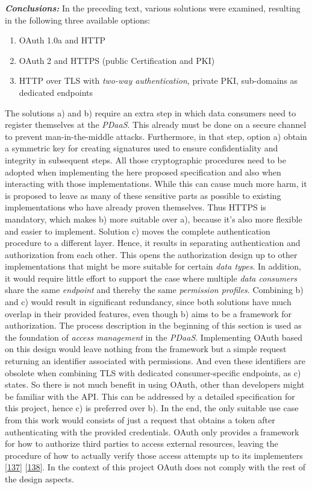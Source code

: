 \documentclass[12pt,english,a4paper,titlepage,cleardoublepage=empty,dottedtoc]{report}
\providecommand{\tightlist}{%
  \setlength{\itemsep}{0pt}\setlength{\parskip}{0pt}}
\begin{document}
\emph{\textbf{Conclusions:}} In the preceding text, various solutions
were examined, resulting in the following three available options:

\begin{enumerate}
\def\labelenumi{\alph{enumi})}
\tightlist
\item
  OAuth 1.0a and HTTP
\item
  OAuth 2 and HTTPS (public Certification and PKI)
\item
  HTTP over TLS with \emph{two-way authentication}, private PKI,
  sub-domains as dedicated endpoints
\end{enumerate}

The solutions a) and b) require an extra step in which data consumers
need to register themselves at the \emph{PDaaS}. This already must be
done on a secure channel to prevent man-in-the-middle attacks.
Furthermore, in that step, option a) obtain a symmetric key for creating
signatures used to ensure confidentiality and integrity in subsequent
steps. All those cryptographic procedures need to be adopted when
implementing the here proposed specification and also when interacting
with those implementations. While this can cause much more harm, it is
proposed to leave as many of these sensitive parts as possible to
existing implementations who have already proven themselves. Thus HTTPS
is mandatory, which makes b) more suitable over a), because it's also
more flexible and easier to implement. Solution c) moves the complete
authentication procedure to a different layer. Hence, it results in
separating authentication and authorization from each other. This opens
the authorization design up to other implementations that might be more
suitable for certain \emph{data types}. In addition, it would require
little effort to support the case where multiple \emph{data consumers}
share the same \emph{endpoint} and thereby the same \emph{permission
profiles}. Combining b) and c) would result in significant redundancy,
since both solutions have much overlap in their provided features, even
though b) aims to be a framework for authorization. The process
description in the beginning of this section is used as the foundation
of \emph{access management} in the \emph{PDaaS}. Implementing OAuth
based on this design would leave nothing from the framework but a simple
request returning an identifier associated with permissions. And even
these identifiers are obsolete when combining TLS with dedicated
consumer-specific endpoints, as c) states. So there is not much benefit
in using OAuth, other than developers might be familiar with the API.
This can be addressed by a detailed specification for this project,
hence c) is preferred over b). In the end, the only suitable use case
from this work would consists of just a request that obtains a token
after authenticating with the provided credentials. OAuth only provides
a framework for how to authorize third parties to access external
resources, leaving the procedure of how to actually verify those access
attempts up to its implementers
{[}\protect\hyperlink{ref-web_spec_oauth-1a_access-verification}{137}{]}
{[}\protect\hyperlink{ref-web_spec_oauth-2_access-verification}{138}{]}.
In the context of this project OAuth does not comply with the rest of
the design aspects.
\end{document}
